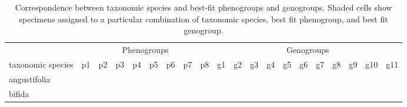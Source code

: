 \documentclass[
  11pt,
]{article}
\begin{document}
\begin{table}[H]

\caption{\label{tab:cladeVIfinalSummary}Correspondence between taxonomic species and best-fit phenogroups and genogroups. Shaded cells show specimens assigned to a particular combination of taxonomic species, best fit phenogroup, and best fit genogroup.}
\centering
\fontsize{8}{10}\selectfont
\begin{tabular}[t]{>{}l|>{}l|>{}l|>{}l|>{}l|>{}l|>{}l|>{}l|>{}l||>{}l|>{}l|>{}l|>{}l|>{}l|>{}l|>{}l|>{}l|>{}l|>{}l|>{}l|}
\toprule
\multicolumn{1}{c}{} & \multicolumn{8}{c}{Phenogroups} & \multicolumn{11}{c}{Genogroups} \\
\cmidrule(l{3pt}r{3pt}){2-9} \cmidrule(l{3pt}r{3pt}){10-20}
taxonomic species & p1 & p2 & p3 & p4 & p5 & p6 & p7 & p8 & g1 & g2 & g3 & g4 & g5 & g6 & g7 & g8 & g9 & g10 & g11\\
\midrule
angustifolia & \cellcolor[HTML]{BBBBBB}{\textcolor[HTML]{BBBBBB}{1}} & \cellcolor[HTML]{FFFFFF}{\textcolor[HTML]{FFFFFF}{0}} & \cellcolor[HTML]{FFFFFF}{\textcolor[HTML]{FFFFFF}{0}} & \cellcolor[HTML]{FFFFFF}{\textcolor[HTML]{FFFFFF}{0}} & \cellcolor[HTML]{FFFFFF}{\textcolor[HTML]{FFFFFF}{0}} & \cellcolor[HTML]{FFFFFF}{\textcolor[HTML]{FFFFFF}{0}} & \cellcolor[HTML]{FFFFFF}{\textcolor[HTML]{FFFFFF}{0}} & \cellcolor[HTML]{BBBBBB}{\textcolor[HTML]{BBBBBB}{1}} & \cellcolor[HTML]{FFFFFF}{\textcolor[HTML]{FFFFFF}{0}} & \cellcolor[HTML]{BBBBBB}{\textcolor[HTML]{BBBBBB}{1}} & \cellcolor[HTML]{BBBBBB}{\textcolor[HTML]{BBBBBB}{1}} & \cellcolor[HTML]{FFFFFF}{\textcolor[HTML]{FFFFFF}{0}} & \cellcolor[HTML]{FFFFFF}{\textcolor[HTML]{FFFFFF}{0}} & \cellcolor[HTML]{FFFFFF}{\textcolor[HTML]{FFFFFF}{0}} & \cellcolor[HTML]{FFFFFF}{\textcolor[HTML]{FFFFFF}{0}} & \cellcolor[HTML]{FFFFFF}{\textcolor[HTML]{FFFFFF}{0}} & \cellcolor[HTML]{FFFFFF}{\textcolor[HTML]{FFFFFF}{0}} & \cellcolor[HTML]{FFFFFF}{\textcolor[HTML]{FFFFFF}{0}} & \cellcolor[HTML]{FFFFFF}{\textcolor[HTML]{FFFFFF}{0}}\\
\midrule
bifida & \cellcolor[HTML]{FFFFFF}{\textcolor[HTML]{FFFFFF}{0}} & \cellcolor[HTML]{BBBBBB}{\textcolor[HTML]{BBBBBB}{1}} & \cellcolor[HTML]{FFFFFF}{\textcolor[HTML]{FFFFFF}{0}} & \cellcolor[HTML]{FFFFFF}{\textcolor[HTML]{FFFFFF}{0}} & \cellcolor[HTML]{FFFFFF}{\textcolor[HTML]{FFFFFF}{0}} & \cellcolor[HTML]{FFFFFF}{\textcolor[HTML]{FFFFFF}{0}} & \cellcolor[HTML]{FFFFFF}{\textcolor[HTML]{FFFFFF}{0}} & \cellcolor[HTML]{FFFFFF}{\textcolor[HTML]{FFFFFF}{0}} & \cellcolor[HTML]{FFFFFF}{\textcolor[HTML]{FFFFFF}{0}} & \cellcolor[HTML]{FFFFFF}{\textcolor[HTML]{FFFFFF}{0}} & \cellcolor[HTML]{FFFFFF}{\textcolor[HTML]{FFFFFF}{0}} & \cellcolor[HTML]{FFFFFF}{\textcolor[HTML]{FFFFFF}{0}} & \cellcolor[HTML]{BBBBBB}{\textcolor[HTML]{BBBBBB}{1}} & \cellcolor[HTML]{FFFFFF}{\textcolor[HTML]{FFFFFF}{0}} & \cellcolor[HTML]{FFFFFF}{\textcolor[HTML]{FFFFFF}{0}} & \cellcolor[HTML]{FFFFFF}{\textcolor[HTML]{FFFFFF}{0}} & \cellcolor[HTML]{FFFFFF}{\textcolor[HTML]{FFFFFF}{0}} & \cellcolor[HTML]{FFFFFF}{\textcolor[HTML]{FFFFFF}{0}} & \cellcolor[HTML]{FFFFFF}{\textcolor[HTML]{FFFFFF}{0}}\\

\end{tabular}
\end{table}
\end{document}
